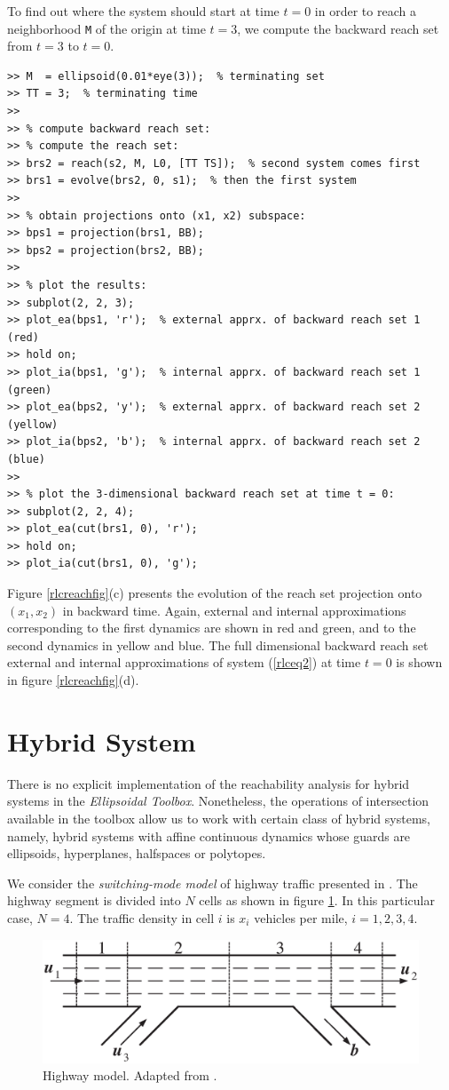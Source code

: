 \documentclass{report}
\begin{document}
To find out where the system should start at time $t=0$ in order to reach
a neighborhood {\tt M} of the origin at time $t=3$,
we compute the backward reach set from $t=3$ to $t=0$.
{\tt \begin{verbatim}
>> M  = ellipsoid(0.01*eye(3));  % terminating set
>> TT = 3;  % terminating time
>>
>> % compute backward reach set:
>> % compute the reach set:
>> brs2 = reach(s2, M, L0, [TT TS]);  % second system comes first
>> brs1 = evolve(brs2, 0, s1);  % then the first system
>>
>> % obtain projections onto (x1, x2) subspace:
>> bps1 = projection(brs1, BB);
>> bps2 = projection(brs2, BB);
>>
>> % plot the results:
>> subplot(2, 2, 3);
>> plot_ea(bps1, 'r');  % external apprx. of backward reach set 1 (red)
>> hold on;
>> plot_ia(bps1, 'g');  % internal apprx. of backward reach set 1 (green)
>> plot_ea(bps2, 'y');  % external apprx. of backward reach set 2 (yellow)
>> plot_ia(bps2, 'b');  % internal apprx. of backward reach set 2 (blue)
>>
>> % plot the 3-dimensional backward reach set at time t = 0:
>> subplot(2, 2, 4);
>> plot_ea(cut(brs1, 0), 'r');
>> hold on;
>> plot_ia(cut(brs1, 0), 'g');
\end{verbatim}}
Figure \ref{rlcreachfig}(c) presents the evolution of the reach set
projection onto $(x_1, x_2)$ in backward time.
Again, external and internal approximations corresponding
to the first dynamics are shown in red and green, and
to the second dynamics in yellow and blue. The
full dimensional backward reach set external and internal
approximations of system (\ref{rlceq2})
at time $t=0$ is shown in figure \ref{rlcreachfig}(d).



\section{Hybrid System}
There is no explicit implementation of the reachability analysis for hybrid
systems in the {\it Ellipsoidal Toolbox}.
Nonetheless, the operations of intersection available in the toolbox allow us
to work with certain class of hybrid systems, namely,
hybrid systems with affine continuous dynamics whose guards are
ellipsoids, hyperplanes, halfspaces or polytopes.

We  consider the {\it switching-mode model} of highway traffic
presented in \cite{xiaotian}. The highway segment is divided into $N$ cells
as shown in figure \ref{hwfig}. In this particular case, $N=4$.
The traffic density in cell $i$ is  $x_i$ vehicles per mile, $i=1,2,3,4$.
\begin{figure}[htbp]
\centerline{
\includegraphics[height=5 cm]{hw.eps}}
\caption{Highway model. Adapted from \cite{xiaotian}.}
\label{hwfig}
\end{figure}
\end{document}
